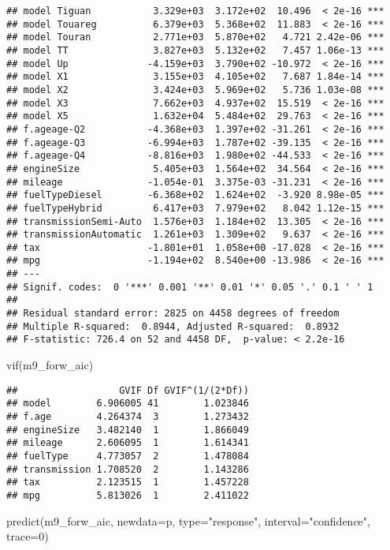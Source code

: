 \documentclass[
]{article}
\newenvironment{Shaded}{\begin{snugshade}}{\end{snugshade}}
\newcommand{\AttributeTok}[1]{\textcolor[rgb]{0.77,0.63,0.00}{#1}}
\newcommand{\DecValTok}[1]{\textcolor[rgb]{0.00,0.00,0.81}{#1}}
\newcommand{\FunctionTok}[1]{\textcolor[rgb]{0.00,0.00,0.00}{#1}}
\newcommand{\NormalTok}[1]{#1}
\newcommand{\StringTok}[1]{\textcolor[rgb]{0.31,0.60,0.02}{#1}}
\begin{document}
\begin{verbatim}
## model Tiguan           3.329e+03  3.172e+02  10.496  < 2e-16 ***
## model Touareg          6.379e+03  5.368e+02  11.883  < 2e-16 ***
## model Touran           2.771e+03  5.870e+02   4.721 2.42e-06 ***
## model TT               3.827e+03  5.132e+02   7.457 1.06e-13 ***
## model Up              -4.159e+03  3.790e+02 -10.972  < 2e-16 ***
## model X1               3.155e+03  4.105e+02   7.687 1.84e-14 ***
## model X2               3.424e+03  5.969e+02   5.736 1.03e-08 ***
## model X3               7.662e+03  4.937e+02  15.519  < 2e-16 ***
## model X5               1.632e+04  5.484e+02  29.763  < 2e-16 ***
## f.ageage-Q2           -4.368e+03  1.397e+02 -31.261  < 2e-16 ***
## f.ageage-Q3           -6.994e+03  1.787e+02 -39.135  < 2e-16 ***
## f.ageage-Q4           -8.816e+03  1.980e+02 -44.533  < 2e-16 ***
## engineSize             5.405e+03  1.564e+02  34.564  < 2e-16 ***
## mileage               -1.054e-01  3.375e-03 -31.231  < 2e-16 ***
## fuelTypeDiesel        -6.368e+02  1.624e+02  -3.920 8.98e-05 ***
## fuelTypeHybrid         6.417e+03  7.979e+02   8.042 1.12e-15 ***
## transmissionSemi-Auto  1.576e+03  1.184e+02  13.305  < 2e-16 ***
## transmissionAutomatic  1.261e+03  1.309e+02   9.637  < 2e-16 ***
## tax                   -1.801e+01  1.058e+00 -17.028  < 2e-16 ***
## mpg                   -1.194e+02  8.540e+00 -13.986  < 2e-16 ***
## ---
## Signif. codes:  0 '***' 0.001 '**' 0.01 '*' 0.05 '.' 0.1 ' ' 1
## 
## Residual standard error: 2825 on 4458 degrees of freedom
## Multiple R-squared:  0.8944, Adjusted R-squared:  0.8932 
## F-statistic: 726.4 on 52 and 4458 DF,  p-value: < 2.2e-16
\end{verbatim}

\begin{Shaded}
\begin{Highlighting}[]
\FunctionTok{vif}\NormalTok{(m9\_forw\_aic)}
\end{Highlighting}
\end{Shaded}

\begin{verbatim}
##                  GVIF Df GVIF^(1/(2*Df))
## model        6.906005 41        1.023846
## f.age        4.264374  3        1.273432
## engineSize   3.482140  1        1.866049
## mileage      2.606095  1        1.614341
## fuelType     4.773057  2        1.478084
## transmission 1.708520  2        1.143286
## tax          2.123515  1        1.457228
## mpg          5.813026  1        2.411022
\end{verbatim}

\begin{Shaded}
\begin{Highlighting}[]
\FunctionTok{predict}\NormalTok{(m9\_forw\_aic, }\AttributeTok{newdata=}\NormalTok{p, }\AttributeTok{type=}\StringTok{"response"}\NormalTok{, }\AttributeTok{interval=}\StringTok{"confidence"}\NormalTok{, }\AttributeTok{trace=}\DecValTok{0}\NormalTok{)}
\end{Highlighting}
\end{Shaded}
\end{document}
